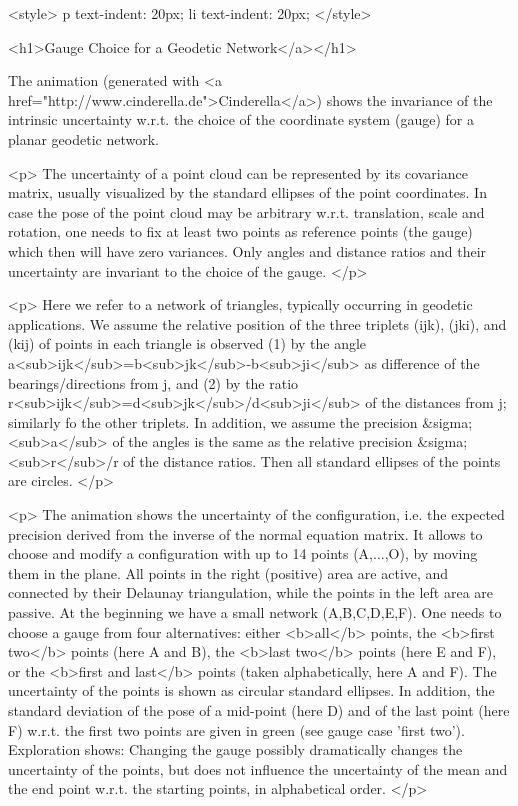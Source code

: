<style>
p {
  text-indent: 20px;
}
li {
  text-indent: 20px;
}
</style>

<h1>Gauge Choice for a Geodetic Network</a></h1> 


The animation (generated with <a
    href="http://www.cinderella.de">Cinderella</a>) shows the invariance of the intrinsic uncertainty w.r.t. the choice of the coordinate system (gauge) for a planar geodetic network.
    

<p> The uncertainty of a point cloud can be represented by its covariance matrix, usually visualized by the standard ellipses of the point coordinates. In case the pose of the point cloud may be arbitrary w.r.t. translation, scale and rotation, one needs to fix at least two points as reference points (the gauge) which then will have zero variances. Only angles and distance ratios and their uncertainty are invariant to the choice of the gauge. </p>
    
<p>    Here we refer to a network of triangles, typically occurring in geodetic applications.  We assume the relative position of the three triplets (ijk), (jki), and (kij) of points in each triangle is observed (1) by the angle a<sub>ijk</sub>=b<sub>jk</sub>-b<sub>ji</sub> as difference of the bearings/directions from j, and (2)  by the ratio r<sub>ijk</sub>=d<sub>jk</sub>/d<sub>ji</sub> of the distances from j; similarly fo the other triplets. In addition, we assume the precision &sigma;<sub>a</sub> of the angles is the same as the relative precision &sigma;<sub>r</sub>/r of the distance ratios. Then all standard ellipses of the points are circles.
</p>
    
<p>    The animation shows the uncertainty of the configuration, i.e. the expected precision derived from the inverse of the normal equation matrix.  It allows to choose and modify a configuration with up to 14 points (A,...,O), by moving them in the plane. All points in the right (positive) area are active, and connected by their Delaunay triangulation, while the points in the left area are passive. At the beginning we have a small network (A,B,C,D,E,F). One needs to choose a gauge from four alternatives: either <b>all</b> points, the  <b>first two</b> points (here A and B), the <b>last two</b> points (here E and F), or the <b>first and last</b> points (taken alphabetically, here A and F). The uncertainty of the points is shown as circular standard ellipses. In addition, the standard deviation of the pose of a mid-point (here D) and of the last point (here F) w.r.t. the first two points are given in green (see gauge case 'first two'). Exploration shows: Changing the gauge possibly dramatically changes the uncertainty of the points, but does not influence the uncertainty of the mean and the end point w.r.t. the starting points, in alphabetical order. </p>
    


